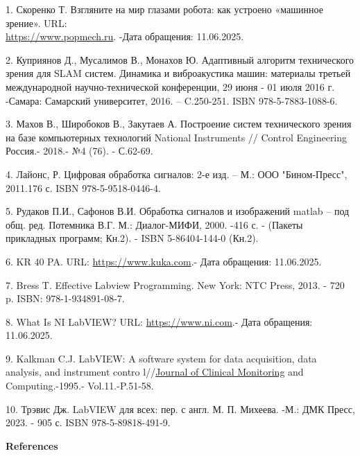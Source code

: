 \begin{references}
1. Скоренко Т. Взгляните на мир глазами робота: как устроено «машинное
зрение». URL:\\
\href{https://www.popmech.ru/technologies/238704-glazami-robota-chtotakoe-mashinnoe-zrenie/}{https://www.popmech.ru}. -Дата обращения: 11.06.2025.

2. Куприянов Д., Мусалимов В., Монахов Ю. Адаптивный алгоритм
технического зрения для SLAM систем. Динамика и виброакустика машин:
материалы третьей международной научно-технической конференции, 29 июня
- 01 июля 2016 г. -Самара: Самарский университет, 2016. -- C.250-251.
ISBN 978-5-7883-1088-6.

3. Махов В., Широбоков В., Закутаев А. Построение систем технического
зрения на базе компьютерных технологий National Instruments // Control
Engineering Россия.- 2018.- №4 (76). - С.62-69.

4. Лайонс, Р. Цифровая обработка сигналов: 2-е изд. -- М.: ООО
"Бином-Пресс", 2011.176 с. ISBN 978-5-9518-0446-4.

5. Рудаков П.И., Сафонов В.И. Обработка сигналов и изображений matlab --
под общ. ред. Потемника В.Г. М.: Диалог-МИФИ, 2000. -416 с. - (Пакеты
прикладных программ; Кн.2). - ISBN 5-86404-144-0 (Кн.2).

6. KR 40 PA.
URL: \href{https://www.kuka.com/en-de/products/robot-systems/industrial-robots/kr-40-pa.html}{https://www.kuka.com}.-
Дата обращения: 11.06.2025.

7. Bress T. Effective Labview Programming. New York: NTC Press, 2013. -
720 p. ISBN: 978-1-934891-08-7.

8. What Is NI LabVIEW? URL: \href{https://www.ni.com/ru-ru/shop/labview.html}{https://www.ni.com}.-
Дата обращения: 11.06.2025.

9. Kalkman C.J. LabVIEW: A software system for data acquisition, data
analysis, and instrument contro
l//\href{https://link.springer.com/journal/10877}{Journal of Clinical
Monitoring} and Computing.-1995.- Vol.11.-P.51-58.

10. Трэвис Дж. LabVIEW для всех: пер. с англ. М. П. Михеева. -М.: ДМК
Пресс, 2023. - 905 с. ISBN 978-5-89818-491-9.
\end{references}

\begin{center}
{\bfseries References}
\end{center}

